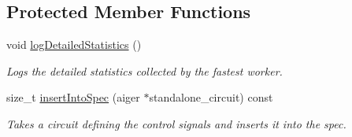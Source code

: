 \subsection*{Protected Member Functions}
\begin{DoxyCompactItemize}
\item 
void \hyperlink{classParExtractor_ab3bcd735169d2a8b3960d7305275b72c}{log\-Detailed\-Statistics} ()
\begin{DoxyCompactList}\small\item\em Logs the detailed statistics collected by the fastest worker. \end{DoxyCompactList}\item 
size\-\_\-t \hyperlink{classCNFImplExtractor_a0970602635f3356712d57ebb28d12c0d}{insert\-Into\-Spec} (aiger $\ast$standalone\-\_\-circuit) const 
\begin{DoxyCompactList}\small\item\em Takes a circuit defining the control signals and inserts it into the spec. \end{DoxyCompactList}\end{DoxyCompactItemize}
